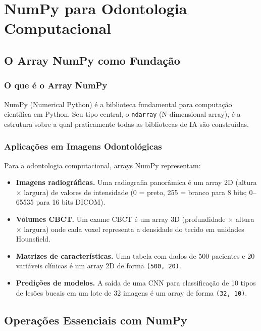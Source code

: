 \section{NumPy para Odontologia Computacional}

\subsection{O Array NumPy como Fundação}

\subsubsection{O que é o Array NumPy}

NumPy  (Numerical Python) é a biblioteca fundamental para computação científica em Python. Seu tipo central, o \texttt{ndarray} (N-dimensional array), é a estrutura sobre a qual praticamente todas as bibliotecas de IA são construídas.

\subsubsection{Aplicações em Imagens Odontológicas}

Para a odontologia computacional, arrays NumPy representam:
\begin{itemize}
    \item \textbf{Imagens radiográficas.} Uma radiografia panorâmica é um array 2D (altura $\times$ largura) de valores de intensidade (0 = preto, 255 = branco para 8 bits; 0--65535 para 16 bits DICOM).
    \item \textbf{Volumes CBCT.} Um exame CBCT é um array 3D (profundidade $\times$ altura $\times$ largura) onde cada voxel representa a densidade do tecido em unidades Hounsfield.
    \item \textbf{Matrizes de características.} Uma tabela com dados de 500 pacientes e 20 variáveis clínicas é um array 2D de forma \texttt{(500, 20)}.
    \item \textbf{Predições de modelos.} A saída de uma CNN para classificação de 10 tipos de lesões bucais em um lote de 32 imagens é um array de forma \texttt{(32, 10)}.
\end{itemize}

\subsection{Operações Essenciais com NumPy}

